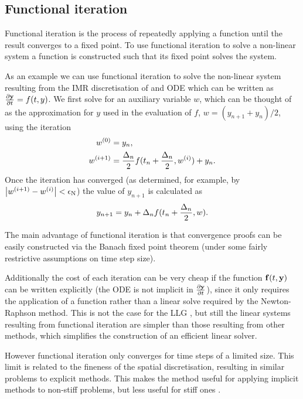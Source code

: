 \subsection{Functional iteration}
\label{sec:picard}

\newcommand{\wconv}{w}

Functional iteration is the process of repeatedly applying a function until the result converges to a fixed point.
To use functional iteration to solve a non-linear system a function is constructed such that its fixed point solves the system.

As an example we can use functional iteration to solve the non-linear system resulting from the IMR discretisation of and ODE which can be written as $\frac{\partial \boldsymbol{\mathrm{y}}}{\partial t} = f(t,y)$.
We first solve for an auxiliary variable $\wconv$, which can be thought of as the approximation for $y$ used in the evaluation of $f$, \ie $\wconv = (y_{n+1} + y_n)/2$, using the iteration
\begin{equation}
  \begin{aligned}
    {w}^{(0)} &= y_n, \\
    {w}^{(i+1)} &= \frac{\Delta_{n}}{2} f(t_n + \frac{\Delta_{n}}{2}, {w}^{(i)}) + y_n.
  \end{aligned}
\end{equation}
Once the iteration has converged (as determined, for example, by $\left|{{w}^{(i+1)} - {w}^{(i)}} \right| < \epsilon_{\mathrm{N}}$) the value of $y_{n+1}$ is calculated as
\begin{equation}
  y_{n+1} = y_n + \dtn f(t_n + \frac{\dtn}{2}, \wconv).
\end{equation}

The main advantage of functional iteration is that convergence proofs can be easily constructed via the Banach fixed point theorem (under some fairly restrictive assumptions on time step size).

Additionally the cost of each iteration can be very cheap if the function ${\boldsymbol{\mathrm{f}}}(t, \boldsymbol{\mathrm{y}})$ can be written explicitly (\ie the ODE is not implicit in $\frac{\partial \boldsymbol{\mathrm{y}}}{\partial t}$), since it only requires the application of a function rather than a linear solve required by the Newton-Raphson method.
This is not the case for the LLG \cite{Bartels2006}, but still the linear systems resulting from functional iteration are simpler than those resulting from other methods, which simplifies the construction of an efficient linear solver.

However functional iteration only converges for time steps of a limited size.
This limit is related to the fineness of the spatial discretisation, resulting in similar problems to explicit methods.
This makes the method useful for applying implicit methods to non-stiff problems, but less useful for stiff ones \cite{Iserles2009}.


